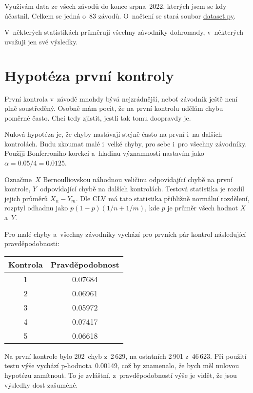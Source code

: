 \documentclass[a4paper,11pt]{article}
\begin{document}
Využívám data ze všech závodů do konce srpna~2022, kterých jsem se kdy účastnil.
Celkem se jedná o~83 závodů. O~načtení se stará soubor
\href{https://github.com/kulisak12/mistake-stats/blob/main/dataset.py}{dataset.py}.

V~některých statistikách průměruji všechny závodníky dohromady, v~některých
uvažuji jen své výsledky.
\pagebreak

\section*{Hypotéza první kontroly}

První kontrola v~závodě mnohdy bývá nejzrádnější, neboť závodník ještě není plně
soustředěný. Osobně mám pocit, že na první kontrolu udělám chybu poměrně často.
Chci tedy zjistit, jestli tak tomu doopravdy je.

Nulová hypotéza je, že chyby nastávají stejně často na první i~na dalších
kontrolách. Budu zkoumat malé i~velké chyby, pro sebe i~pro všechny závodníky.
Použiji Bonferroniho korekci a~hladinu významnosti nastavím jako
$\alpha = 0.05 / 4 = 0.0125$.

Označme~$X$ Bernoulliovskou náhodnou veličinu odpovídající chybě na první
kontrole, $Y$~odpovídající chybě na dalších kontrolách. Testová statistika je
rozdíl jejich průměrů $\overline{X}_n - \overline{Y}_m$. Dle CLV má tato
statistika přibližně normální rozdělení, rozptyl odhadnu jako
$p (1-p) (1/n + 1/m)$, kde $p$ je průměr všech hodnot $X$ a~$Y$.

Pro malé chyby a~všechny závodníky vychází pro prvních pár kontrol následující
pravděpodobnosti:

\begin{tabular}{c | c}
    Kontrola & Pravděpodobnost \\
    \hline
    1        & 0.07684         \\
    2        & 0.06961         \\
    3        & 0.05972         \\
    4        & 0.07417         \\
    5        & 0.06618         \\
\end{tabular}

Na první kontrole bylo 202~chyb z~2\,629, na ostatních 2\,901 z~46\,623. Při
použití testu výše vychází p-hodnota~0.00149, což by znamenalo, že bych měl
nulovou hypotézu zamítnout. To je zvláštní, z~pravděpodobností výše je vidět, že
jsou výsledky dost zašuměné.
\end{document}
